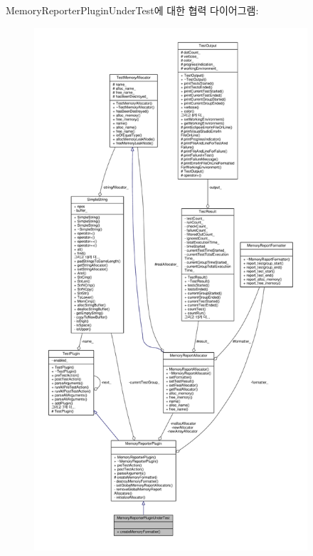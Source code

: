 Memory\+Reporter\+Plugin\+Under\+Test에 대한 협력 다이어그램\+:
\nopagebreak
\begin{figure}[H]
\begin{center}
\leavevmode
\includegraphics[height=550pt]{class_memory_reporter_plugin_under_test__coll__graph}
\end{center}
\end{figure}
